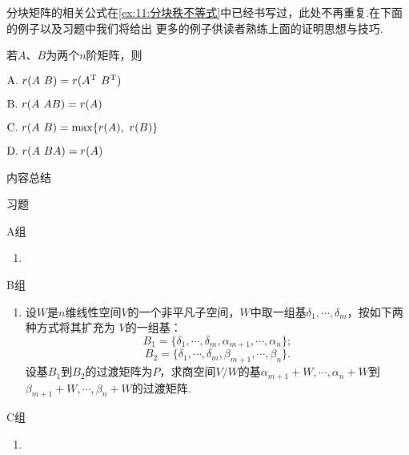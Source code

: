 分块矩阵的相关公式在\autoref{ex:11:分块秩不等式}中已经书写过，此处不再重复.在下面的例子以及习题中我们将给出
更多的例子供读者熟练上面的证明思想与技巧.
\begin{example}
    若$A$、$B$为两个$n$阶矩阵，则

	$\textup{A}.\ r(A\ B)=r(A^\mathrm{T}\ B^\mathrm{T})$

	$\textup{B}.\ r(A\ AB)=r(A)$

	$\textup{C}.\ r(A\ B)=\max\{r(A),\ r(B)\}$

	$\textup{D}.\ r(A\ BA)=r(A)$
\end{example}
\begin{solution}

\end{solution}

\vspace{2ex}
\centerline{\heiti \Large 内容总结}

\vspace{2ex}

\centerline{\heiti \Large 习题}
\vspace{2ex}
{\kaishu }
\begin{flushright}
    \kaishu

\end{flushright}
\centerline{\heiti A组}
\begin{enumerate}
    \item
\end{enumerate}
\centerline{\heiti B组}
\begin{enumerate}
    \item 设$W$是$n$维线性空间$V$的一个非平凡子空间，$W$中取一组基$\delta_1,\cdots,\delta_m$，按如下两种方式将其扩充为
	$V$的一组基：
	$$B_1=\{\delta_1,\cdots,\delta_m,\alpha_{m+1},\cdots,\alpha_n\};$$
	$$B_2=\{\delta_1,\cdots,\delta_m,\beta_{m+1},\cdots,\beta_n\}.$$
	设基$B_1$到$B_2$的过渡矩阵为$P$，求商空间$V/W$的基$\alpha_{m+1}+W,\cdots,\alpha_n+W$到
	$\beta_{m+1}+W,\cdots,\beta_n+W$的过渡矩阵.
\end{enumerate}
\centerline{\heiti C组}
\begin{enumerate}
    \item
\end{enumerate}
